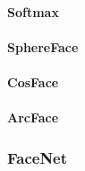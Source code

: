 \paragraph{Softmax\cite{Centreloss}}
\paragraph{SphereFace}
\paragraph{CosFace\cite{Cosface}}
\paragraph{ArcFace\cite{Arcface}}


\subsubsection{FaceNet}\label{sec:tripletloss}



